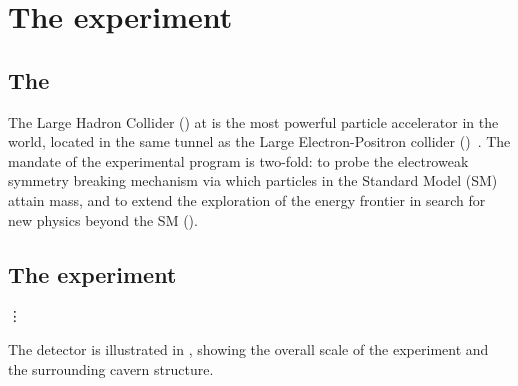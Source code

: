 \chapter{The \CMS experiment}
\label{chap:MoreStuff}


\section{The \LHC}
The Large Hadron Collider (\LHC) at \CERN is the most powerful particle accelerator in the world, located in the same tunnel as the Large Electron-Positron collider (\LEP)~\cite{Brianti:2004qq}. The mandate of the \LHC experimental program is two-fold: to probe the electroweak symmetry breaking mechanism via which particles in the Standard Model (SM) attain mass, and to extend the exploration of the energy frontier in search for new physics beyond the SM (\BSM).

\section{The \CMS experiment}
\label{sec:CMSInDetail}


\vspace{1cm}

\begin{center}
{\hspace{1mm}\Large\vdots\hspace{1cm}}
\end{center}

\vspace{1cm}

The detector is illustrated in , showing
the overall scale of the experiment and the surrounding cavern structure.
%

